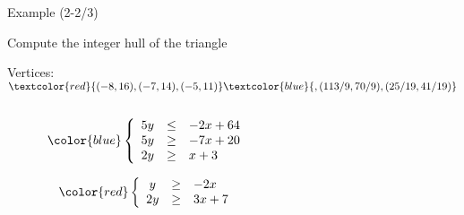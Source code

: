\begin{frame}{Example (2-2/3)}
	\begin{block}{}
		Compute the integer hull of the triangle
		
		Vertices: $\textcolor{red}{(-8,16),(-7,14),(-5,11)}\textcolor{blue}{,(113/9,70/9),(25/19,41/19)}$
		\begin{columns}
			\begin{column}{0.2\textwidth}
				\begin{center}
					\begin{equation*}
						\color{blue}
						\left\{   \begin{array}{crl}
							5y &\le& -2x + 64\\ 
							5y &\ge& -7x + 20\\
							2y &\ge& x + 3
							
						\end{array}
						\right.
					\end{equation*}
					\smallskip
					
					\begin{equation*}
						\color{red}
						\left\{   \begin{array}{crl}
							y &\ge& -2x\\
							2y &\ge& 3x + 7
						\end{array}
						\right.
					\end{equation*}
					
				\end{center}
				
			\end{column}
			\hfill
			\begin{column}{0.8\textwidth}
				
				
				\begin{center}
					\begin{figure}[H]
						\scalebox{.7}{}
					\end{figure}
					
				\end{center}
				
			\end{column}
		\end{columns}
		
	\end{block}
	
	
\end{frame}

